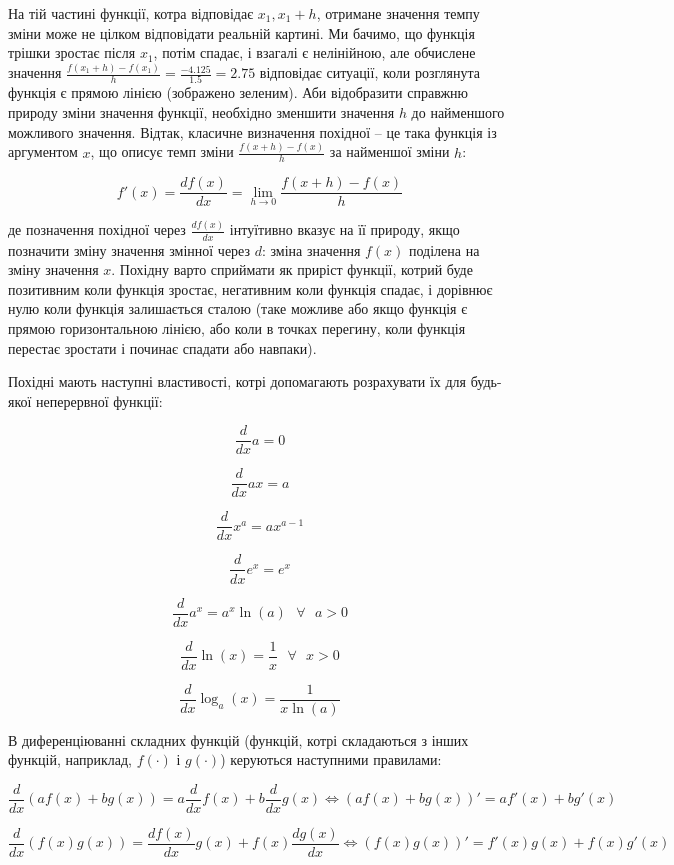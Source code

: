 \documentclass[
  11pt,
]{book}
\begin{document}
На тій частині функції, котра відповідає \(x_1, x_1+h\), отримане значення темпу зміни може не цілком відповідати реальній картині. Ми бачимо, що функція трішки зростає після \(x_1\), потім спадає, і взагалі є нелінійною, але обчислене значення \(\frac{f(x_1 + h) - f(x_1)}{h} = \frac{-4.125}{1.5} = 2.75\) відповідає ситуації, коли розглянута функція є прямою лінією (зображено зеленим). Аби відобразити справжню природу зміни значення функції, необхідно зменшити значення \(h\) до найменшого можливого значення. Відтак, класичне визначення похідної -- це така функція із аргументом \(x\), що описує темп зміни \(\frac{f(x+h) - f(x)}{h}\) за найменшої зміни \(h\):

\[f'(x) = \frac{df(x)}{dx} = \lim\limits_{h \rightarrow 0}\frac{f(x+h) - f(x)}{h}\]

де позначення похідної через \(\frac{df(x)}{dx}\) інтуїтивно вказує на її природу, якщо позначити зміну значення змінної через \(d\): зміна значення \(f(x)\) поділена на зміну значення \(x\). Похідну варто сприймати як приріст функції, котрий буде позитивним коли функція зростає, негативним коли функція спадає, і дорівнює нулю коли функція залишається сталою (таке можливе або якщо функція є прямою горизонтальною лінією, або коли в точках перегину, коли функція перестає зростати і починає спадати або навпаки).

Похідні мають наступні властивості, котрі допомагають розрахувати їх для будь-якої неперервної функції:

\[\frac{d}{dx}a = 0\]

\[\frac{d}{dx}ax = a\]

\[\frac{d}{dx} x^a = ax^{a-1}\]

\[\frac{d}{dx} e^x = e^x\]

\[\frac{d}{dx} a^x = a^x \ln (a) \text{ } \forall \text{ } a>0\]

\[\frac{d}{dx} \ln (x) = \frac{1}{x} \text{ } \forall \text{ } x>0\]

\[\frac{d}{dx} \log_a(x) = \frac{1}{x \ln(a)}\]

В диференціюванні складних функцій (функцій, котрі складаються з інших функцій, наприклад, \(f(\cdot)\) і \(g(\cdot)\)) керуються наступними правилами:

\[\frac{d}{dx} \left( af(x) + b g(x) \right) = a \frac{d}{dx}f(x) + b \frac{d}{dx}g(x) \iff (af(x) + bg(x))' = af'(x) + bg'(x)\]

\[\frac{d}{dx}(f(x)g(x)) = \frac{df(x)}{dx} g(x) + f(x) \frac{dg(x)}{dx} \iff (f(x)g(x))' = f'(x)g(x) + f(x)g'(x)\]
\end{document}
